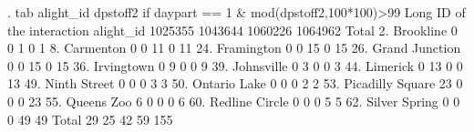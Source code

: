 . tab alight_id dpstoff2 if daypart == 1 \& mod(dpstoff2,100*100)>99
{\smallskip}
                     {\VBAR}         Long ID of the interaction
           alight_id {\VBAR}   1025355    1043644    1060226    1064962 {\VBAR}     Total
        2. Brookline {\VBAR}         0          0          1          0 {\VBAR}         1 
        8. Carmenton {\VBAR}         0          0         11          0 {\VBAR}        11 
      24. Framington {\VBAR}         0          0         15          0 {\VBAR}        15 
  26. Grand Junction {\VBAR}         0          0         15          0 {\VBAR}        15 
      36. Irvingtown {\VBAR}         0          9          0          0 {\VBAR}         9 
      39. Johnsville {\VBAR}         0          3          0          0 {\VBAR}         3 
        44. Limerick {\VBAR}         0         13          0          0 {\VBAR}        13 
    49. Ninth Street {\VBAR}         0          0          0          3 {\VBAR}         3 
    50. Ontario Lake {\VBAR}         0          0          0          2 {\VBAR}         2 
53. Picadilly Square {\VBAR}        23          0          0          0 {\VBAR}        23 
      55. Queens Zoo {\VBAR}         6          0          0          0 {\VBAR}         6 
  60. Redline Circle {\VBAR}         0          0          0          5 {\VBAR}         5 
   62. Silver Spring {\VBAR}         0          0          0         49 {\VBAR}        49 
               Total {\VBAR}        29         25         42         59 {\VBAR}       155 
{\smallskip}
{\smallskip}
